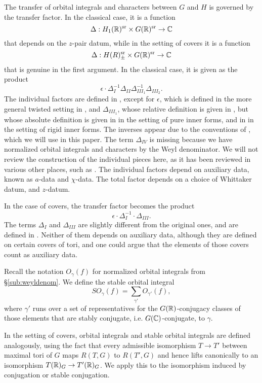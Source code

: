 \documentclass{article}
\theoremstyle{definition}
\numberwithin{equation}{section}
\renewcommand{\-}{\hyp{}}
\begin{document}
The transfer of orbital integrals and characters between $G$ and $H$ is governed by the transfer factor. In the classical case, it is a function
\[ \Delta : H_1(\mathbb{R})^{\textrm{sr}} \times G(\mathbb{R})^{\textrm{sr}} \to \mathbb{C} \]
that depends on the $z$-pair datum, while in the setting of covers it is a function
\[ \Delta : H(R)_\pm^{\textrm{sr}} \times G(\mathbb{R})^{\textrm{sr}} \to \mathbb{C} \]
that is genuine in the first argument. In the classical case, it is given as the product
\[ \epsilon \cdot \Delta_I^{-1}\Delta_{II}\Delta_{III_1}^{-1}\Delta_{III_2}. \]
The individual factors are defined in \cite{LS87}, except for $\epsilon$, which is defined in the more general twisted setting in \cite[\S5.3]{KS99}, and $\Delta_{III_1}$, whose relative definition is given in \cite{LS87}, but whose absolute definition is given in \cite{KalECI} in the setting of pure inner forms, and in \cite{KalRI} in the setting of rigid inner forms. The inverses appear due to the conventions of \cite[(1.0.4)]{KS12}, which we will use in this paper. The term $\Delta_{IV}$ is missing because we have normalized orbital integrals and characters by the Weyl denominator. We will not review the construction of the individual pieces here, as it has been reviewed in various other places, such as \cite[\S3.5,\S4.2,\S4.3]{KalIMS}. The individual factors depend on auxiliary data, known as $a$-data and $\chi$-data. The total factor depends on a choice of Whittaker datum, and $z$-datum.

In the case of covers, the transfer factor becomes the product
\[ \epsilon \cdot \Delta_I^{-1} \cdot \Delta_{III}.\]
The terms $\Delta_I$ and $\Delta_{III}$ are slightly different from the original ones, and are defined in \cite[\S4.3]{KalHDC}. Neither of them depends on auxiliary data, although they are defined on certain covers of tori, and one could argue that the elements of those covers count as auxiliary data.

Recall the notation $O_\gamma(f)$ for normalized orbital integrals from \S\ref{sub:weyldenom}. We define the stable orbital integral
\[ SO_\gamma(f) = \sum_{\gamma'} O_{\gamma'}(f), \]
where $\gamma'$ runs over a set of representatives for the $G(\mathbb{R})$-conjugacy classes of those elements that are stably conjugate, i.e. $G(\mathbb{C})$-conjugate, to $\gamma$.

In the setting of covers, orbital integrals and stable orbital integrals are defined analogously, using the fact that every admissible isomorphism $T \to T'$ between maximal tori of $G$ maps $R(T,G)$ to $R(T',G)$ and hence lifts canonically to an isomorphism $T(\mathbb{R})_G \to T'(\mathbb{R})_G$. We apply this to the isomorphism induced by conjugation or stable conjugation. 
\end{document}
